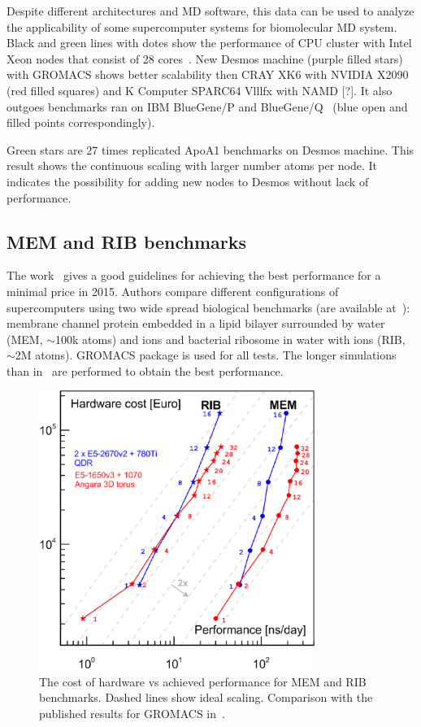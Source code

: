 \documentclass{llncs}
\begin{document}
Despite different architectures and MD software, this data can be used to analyze the applicability of some supercomputer systems for biomolecular MD system. Black and green lines with dotes show the performance of CPU cluster with Intel Xeon nodes that consist of 28 cores~\cite{Smirnov2016}. New Desmos machine (purple filled stars) with GROMACS shows better scalability then CRAY XK6 with NVIDIA X2090~\cite{Sun2012} (red filled squares) and K Computer SPARC64 Vlllfx with NAMD [?]. It also outgoes benchmarks ran on IBM BlueGene/P and BlueGene/Q~\cite{Kumar2013} (blue open and filled points correspondingly). 

Green stars are 27 times replicated ApoA1 benchmarks on Desmos machine. This result shows the continuous scaling with larger number atoms per node. It indicates the possibility for adding new nodes to Desmos without lack of performance.

\subsection{MEM and RIB benchmarks}

The work~\cite{Kutzner2015} gives a good guidelines for achieving the best performance for a minimal price in 2015. Authors compare different configurations of supercomputers using two wide spread biological benchmarks (are available at~\cite{bench}): membrane channel protein embedded in a lipid bilayer surrounded by water (MEM, $\sim $100k atoms) and ions and bacterial ribosome in water with ions (RIB, $\sim$2M atoms). GROMACS package is used for all tests. The longer simulations than in~\cite{Kutzner2015} are performed to obtain the best performance.

\begin{figure}[h]
\centering
\includegraphics[width=0.8\textwidth]{img/best_bang.eps}
\caption{\label{BestBang}The cost of hardware vs achieved performance for MEM and RIB benchmarks. Dashed lines show ideal scaling. Comparison with the published results for GROMACS in~\cite{Kutzner2015}.}
\end{figure}
\end{document}
